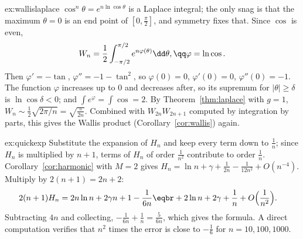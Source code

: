 \begin{solution}{ex:wallislaplace}
\idea $\cos^n\theta=e^{n\ln\cos\theta}$ is a Laplace integral; the only snag is that the maximum $\theta=0$ is an end point of $[0,\frac\pi2]$, and symmetry fixes that.
\writeup Since $\cos$ is even,
\[
\begin{gathered}W_n=\frac12\int_{-\pi/2}^{\pi/2}e^{n\varphi(\theta)}\dd\theta,\qq\varphi=\ln\cos.\end{gathered}
\]
Then $\varphi'=-\tan$, $\varphi''=-1-\tan^2$, so
$\varphi(0)=0$, $\varphi'(0)=0$, $\varphi''(0)=-1$. The function $\varphi$ increases up to $0$ and decreases after, so its supremum for $|\theta|\ge\delta$ is
$\ln\cos\delta<0$; and $\int e^\varphi=\int\cos=2$. By Theorem~\ref{thm:laplace} with $g=1$, $W_n\sim\frac12\sqrt{2\pi/n}=\sqrt{\frac\pi{2n}}$. Combined with $W_{2n}W_{2n+1}$ computed by
integration by parts, this gives the Wallis product (Corollary~\ref{cor:wallis}) again.
\end{solution}

\begin{solution}{ex:quickexp}
\idea Substitute the expansion of $H_n$ and keep every term down to $\frac1n$; since $H_n$ is multiplied by $n+1$, terms of $H_n$ of order $\frac1{n^2}$ contribute to order $\frac1n$.
\writeup Corollary~\ref{cor:harmonic} with $M=2$ gives $H_n=\ln n+\gamma+\frac1{2n}-\frac1{12n^2}+O(n^{-4})$. Multiply by $2(n+1)=2n+2$:
\[
\begin{aligned}2(n+1)H_n&=2n\ln n+2\gamma n+1-\frac1{6n}\eqbr+2\ln n+2\gamma+\frac1n+O\Bigl(\frac1{n^2}\Bigr).\end{aligned}
\]
Subtracting $4n$ and collecting, $-\frac1{6n}+\frac1n=\frac5{6n}$, which gives the formula. A direct computation verifies that $n^2$ times the error is close to $-\frac16$ for $n=10,100,1000$.
\end{solution}

